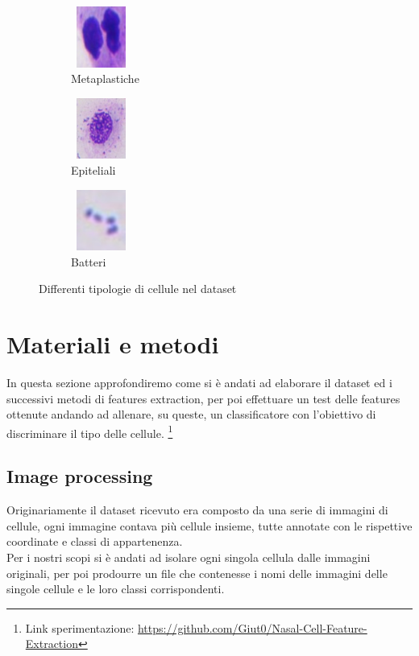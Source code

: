 \documentclass[italian,10pt,a4paper]{article}
\begin{document}
\begin{figure}[h]
						\label{fig:multiple_images2}
						\begin{subfigure}[h]{70px}
							\centering
							\includegraphics[width=2cm, height=2cm]{metaplatic.jpg}
							\caption{Metaplastiche}
							\label{fig:image7}
						\end{subfigure}
						\hfill
						\begin{subfigure}[h]{70px}
							\centering
							\includegraphics[width=2cm, height=2cm]{epiteliali.jpg}
							\caption{Epiteliali}
							\label{fig:image8}
						\end{subfigure}
						\hfill
						\begin{subfigure}[h]{70px}
							\centering
							\includegraphics[width=2cm, height=2cm]{batteri.jpg}
							\caption{Batteri}
							\label{fig:image9}
						\end{subfigure}
						
						\caption{Differenti tipologie di cellule nel dataset}
						\label{fig:multiple_images3}
					\end{figure}
		
	\section{Materiali e metodi}
		In questa sezione approfondiremo come si è andati ad elaborare il dataset ed i successivi metodi di features extraction, per poi effettuare un test delle features ottenute andando ad allenare, su queste, un classificatore con l'obiettivo di discriminare il tipo delle cellule. \footnote{Link sperimentazione: \href{https://github.com/Giut0/Nasal-Cell-Feature-Extraction}{https://github.com/Giut0/Nasal-Cell-Feature-Extraction}}
		
		\subsection{Image processing}
			Originariamente il dataset ricevuto era composto da una serie di immagini di cellule, ogni immagine contava più cellule insieme, tutte annotate con le rispettive coordinate e classi di appartenenza.\\
			Per i nostri scopi si è andati ad isolare ogni singola cellula dalle immagini originali, per poi prodourre un file che contenesse i nomi delle immagini delle singole cellule e le loro classi corrispondenti.
			
\end{document}
